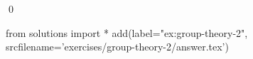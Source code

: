 
\begin{ex} 
  \label{ex:group-theory-2}
  
  \qed
\end{ex} 
\begin{python0}
from solutions import *
add(label="ex:group-theory-2",
    srcfilename='exercises/group-theory-2/answer.tex') 
\end{python0}
